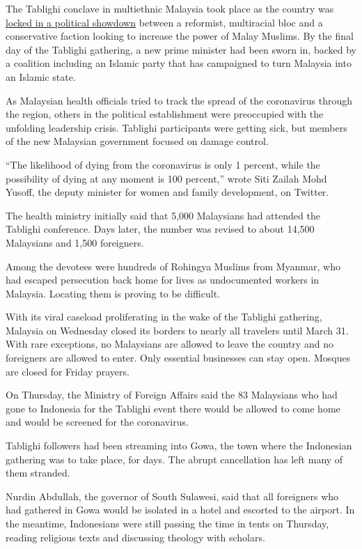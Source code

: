 The Tablighi conclave in multiethnic Malaysia took place as the country
was
\href{https://www.nytimes3xbfgragh.onion/2020/02/29/world/asia/malaysia-mahathir-mohamad.html}{locked
in a political showdown} between a reformist, multiracial bloc and a
conservative faction looking to increase the power of Malay Muslims. By
the final day of the Tablighi gathering, a new prime minister had been
sworn in, backed by a coalition including an Islamic party that has
campaigned to turn Malaysia into an Islamic state.

As Malaysian health officials tried to track the spread of the
coronavirus through the region, others in the political establishment
were preoccupied with the unfolding leadership crisis. Tablighi
participants were getting sick, but members of the new Malaysian
government focused on damage control.

``The likelihood of dying from the coronavirus is only 1 percent, while
the possibility of dying at any moment is 100 percent,'' wrote Siti
Zailah Mohd Yusoff, the deputy minister for women and family
development, on Twitter.

The health ministry initially said that 5,000 Malaysians had attended
the Tablighi conference. Days later, the number was revised to about
14,500 Malaysians and 1,500 foreigners.

Among the devotees were hundreds of Rohingya Muslims from Myanmar, who
had escaped persecution back home for lives as undocumented workers in
Malaysia. Locating them is proving to be difficult.

With its viral caseload proliferating in the wake of the Tablighi
gathering, Malaysia on Wednesday closed its borders to nearly all
travelers until March 31. With rare exceptions, no Malaysians are
allowed to leave the country and no foreigners are allowed to enter.
Only essential businesses can stay open. Mosques are closed for Friday
prayers.

On Thursday, the Ministry of Foreign Affairs said the 83 Malaysians who
had gone to Indonesia for the Tablighi event there would be allowed to
come home and would be screened for the coronavirus.

Tablighi followers had been streaming into Gowa, the town where the
Indonesian gathering was to take place, for days. The abrupt
cancellation has left many of them stranded.

Nurdin Abdullah, the governor of South Sulawesi, said that all
foreigners who had gathered in Gowa would be isolated in a hotel and
escorted to the airport. In the meantime, Indonesians were still passing
the time in tents on Thursday, reading religious texts and discussing
theology with scholars.

